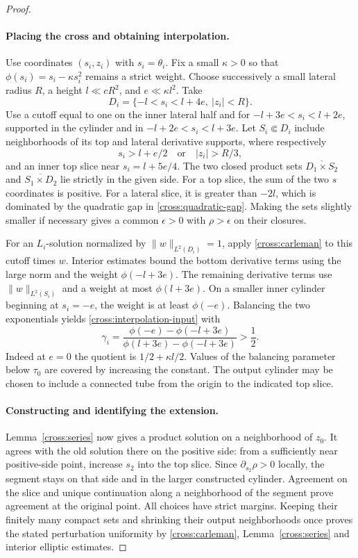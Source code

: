 \begin{proof}
\paragraph{Placing the cross and obtaining interpolation.}
Use coordinates $(s_i,z_i)$ with $s_i=\theta_i$. Fix a small
$\kappa>0$ so that $\phi(s_i)=s_i-\kappa s_i^2$ remains a strict weight.
Choose successively a small lateral radius $R$, a height
$l\ll cR^2$, and $e\ll\kappa l^2$.  Take
\[
 D_i=\{-l<s_i<l+4e,\ |z_i|<R\}.
\]
Use a cutoff equal to one on the inner lateral half and for
$-l+3e<s_i<l+2e$, supported in the cylinder and in
$-l+2e<s_i<l+3e$.
Let $S_i\Subset D_i$ include neighborhoods of its top and lateral
derivative supports, where respectively
\[
 s_i>l+e/2\quad\text{or}\quad |z_i|>R/3,
\]
and an inner top slice near $s_i=l+5e/4$.
The two closed product sets $\overline{D_1\times S_2}$ and
$\overline{S_1\times D_2}$ lie strictly in the given side.
For a top slice, the sum of the two $s$ coordinates is positive.
For a lateral slice, it is greater than $-2l$, which is dominated
by the quadratic gap in \eqref{cross:quadratic-gap}.
Making the sets slightly smaller if necessary gives a common
$\epsilon>0$ with $\rho>\epsilon$ on their closures.

For an $L_i$-solution normalized by $\|w\|_{L^2(D_i)}=1$, apply
\eqref{cross:carleman} to this cutoff times $w$.  Interior estimates
bound the bottom derivative terms using the large norm and the weight
$\phi(-l+3e)$.  The remaining derivative terms use
$\|w\|_{L^2(S_i)}$ and a weight at most $\phi(l+3e)$.
On a smaller inner cylinder beginning at $s_i=-e$, the weight is at
least $\phi(-e)$.  Balancing the two exponentials yields
\eqref{cross:interpolation-input} with
\begin{equation}\label{cross:exponent}
 \gamma_i=
 \frac{\phi(-e)-\phi(-l+3e)}{
       \phi(l+3e)-\phi(-l+3e)}>\frac12.
\end{equation}
Indeed at $e=0$ the quotient is $1/2+\kappa l/2$.
Values of the balancing parameter below $\tau_0$ are covered by
increasing the constant.  The output cylinder may be chosen to include
a connected tube from the origin to the indicated top slice.

\paragraph{Constructing and identifying the extension.}
Lemma~\ref{cross:series} now gives a product solution on a neighborhood
of $z_0$. It agrees with the old solution there on the positive side:
from a sufficiently near positive-side point, increase $s_2$ into
the top slice.  Since $\partial_{s_2}\rho>0$ locally, the segment stays
on that side and in the larger constructed cylinder.  Agreement on
the slice and unique continuation along a neighborhood of the segment
prove agreement at the original point.
All choices have strict margins.  Keeping their finitely many compact
sets and shrinking their output neighborhoods once proves the stated
perturbation uniformity by \eqref{cross:carleman},
Lemma~\ref{cross:series} and interior elliptic estimates.
\end{proof}

